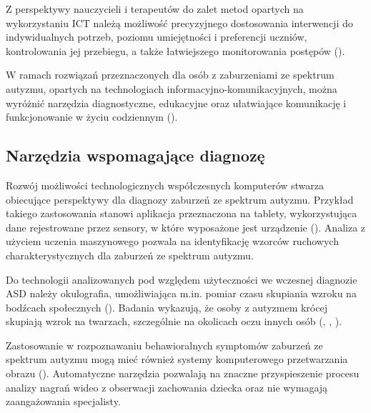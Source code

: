     Z perspektywy nauczycieli i terapeutów do zalet metod opartych na wykorzystaniu ICT należą możliwość precyzyjnego dostosowania interwencji do indywidualnych potrzeb, poziomu umiejętności i preferencji uczniów, kontrolowania jej przebiegu, a także łatwiejszego monitorowania postępów (\cite{boucenna2014interactive}).
    
    
    W ramach rozwiązań przeznaczonych dla osób z zaburzeniami ze spektrum autyzmu, opartych na technologiach informacyjno-komunikacyjnych, można wyróżnić narzędzia diagnostyczne, edukacyjne oraz ułatwiające komunikację i funkcjonowanie w życiu codziennym (\cite{landowska2014technologie}).
    
    \subsection{Narzędzia wspomagające diagnozę}
    Rozwój możliwości technologicznych współczesnych komputerów stwarza obiecujące perspektywy dla diagnozy zaburzeń ze spektrum autyzmu.
    Przykład takiego zastosowania stanowi aplikacja przeznaczona na tablety, wykorzystująca dane rejestrowane przez sensory, w które wyposażone jest urządzenie (\cite{anzulewicz2016toward}).
    Analiza z użyciem uczenia maszynowego pozwala na identyfikację wzorców ruchowych charakterystycznych dla zaburzeń ze spektrum autyzmu.
    
    Do technologii analizowanych pod względem użyteczności we wczesnej diagnozie ASD należy okulografia, umożliwiająca m.in. pomiar czasu skupiania wzroku na bodźcach społecznych (\cite{falck2013eye}).
    Badania wykazują, że osoby z autyzmem krócej skupiają wzrok na twarzach, szczególnie na okolicach oczu innych osób (\cite{falck2013eye}, \cite{jones2008absence}, \cite{jones2013attention}).
    
    Zastosowanie w rozpoznawaniu behawioralnych symptomów zaburzeń ze spektrum autyzmu mogą mieć również systemy komputerowego przetwarzania obrazu (\cite{hashemi2012computer}).
    Automatyczne narzędzia pozwalają na znaczne przyspieszenie procesu analizy nagrań wideo z obserwacji zachowania dziecka oraz nie wymagają zaangażowania specjalisty.
    
